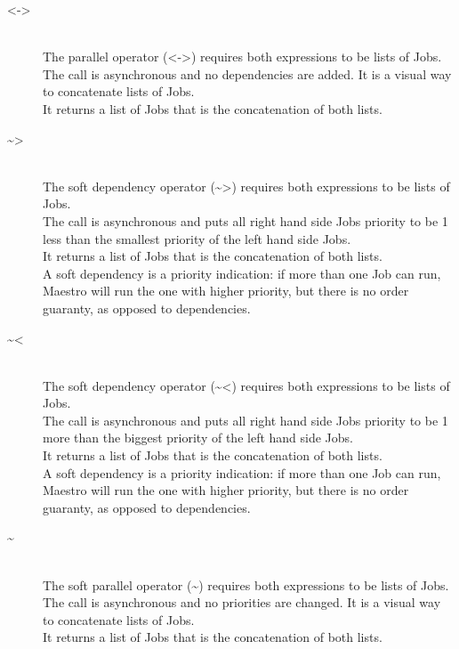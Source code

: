 \documentclass[12pt]{article}
\begin{document}
\begin{description}
\item[<->] \hfil \\
The parallel operator (<->) requires both expressions to be lists of Jobs.\\
The call is asynchronous and no dependencies are added. It is a visual way to
concatenate lists of Jobs.\\
It returns a list of Jobs that is the concatenation of both lists.

\item[\textasciitilde>] \hfil \\
The soft dependency operator (\textasciitilde>) requires both expressions to be lists of Jobs.\\
The call is asynchronous and puts all right hand side Jobs priority to be 1 less than the smallest
priority of the left hand side Jobs.\\
It returns a list of Jobs that is the concatenation of both lists.\\
A soft dependency is a priority indication: if more than one Job can run, Maestro will run the
one with higher priority, but there is no order guaranty, as opposed to dependencies.

\item[\textasciitilde<] \hfil \\
The soft dependency operator (\textasciitilde<) requires both expressions to be lists of Jobs.\\
The call is asynchronous and puts all right hand side Jobs priority to be 1 more than the biggest
priority of the left hand side Jobs.\\
It returns a list of Jobs that is the concatenation of both lists.\\
A soft dependency is a priority indication: if more than one Job can run, Maestro will run the
one with higher priority, but there is no order guaranty, as opposed to dependencies.

\item[\textasciitilde] \hfil \\
The soft parallel operator (\textasciitilde) requires both expressions to be lists of Jobs.\\
The call is asynchronous and no priorities are changed. It is a visual way to
concatenate lists of Jobs.\\
It returns a list of Jobs that is the concatenation of both lists.
\end{description}
\end{document}
